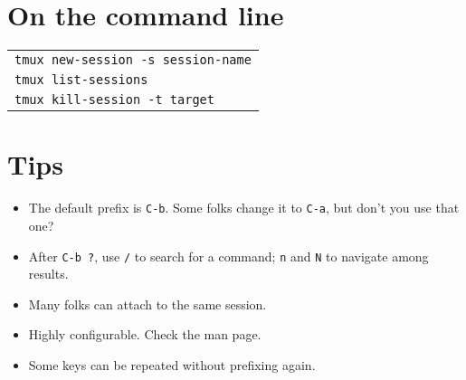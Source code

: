 \documentclass[landscape]{article}
\newcommand{\blankfirst}{%
  \ifodd\rownum\advance\rownum1\relax\fi}
\newcommand{\coloredfirst}{%
  \blankfirst\advance\rownum1\relax}
\begin{document}
\begin{multicols}{3}
  \section*{On the command line}
  \ifodd\rownum\advance{}\relax\fi
  \coloredfirst
  \begin{tabular}{p{2.9in}}
    \verb|tmux new-session -s session-name|\\
    \verb|tmux list-sessions|\\
    \verb|tmux kill-session -t target|
  \end{tabular}
  \section*{Tips}
  \begin{itemize}
  \item The default prefix is \verb|C-b|.  Some folks change it to \verb|C-a|, but don't you use that one?
  \item After \verb|C-b ?|, use \verb|/| to search for a command;
    \verb|n| and \verb|N| to navigate among results.
  \item Many folks can attach to the same session.
  \item Highly configurable.  Check the man page.
  \item Some keys can be repeated without prefixing again.
  \end{itemize}
\end{multicols}
\end{document}
